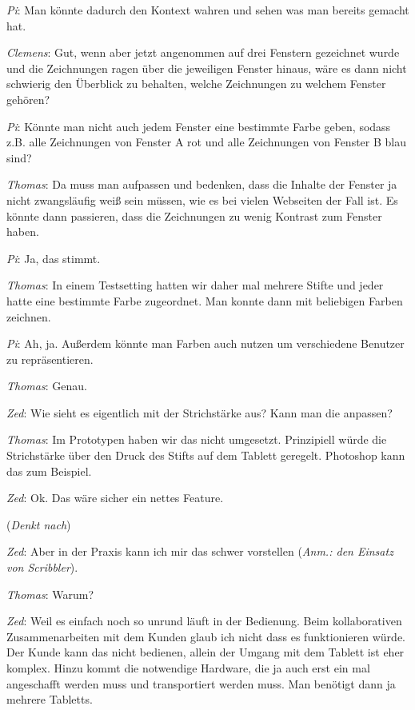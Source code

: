 \medskip \emph{Pi}: Man könnte dadurch den Kontext wahren und sehen was man bereits gemacht hat. 

\medskip \emph{Clemens}: Gut, wenn aber jetzt angenommen auf drei Fenstern gezeichnet wurde und die Zeichnungen ragen über die jeweiligen Fenster hinaus, wäre es dann nicht schwierig den Überblick zu behalten, welche Zeichnungen zu welchem Fenster gehören?

\medskip \emph{Pi}: Könnte man nicht auch jedem Fenster eine bestimmte Farbe geben, sodass z.B. alle Zeichnungen von Fenster A rot und alle Zeichnungen von Fenster B blau sind?

\medskip \emph{Thomas}: Da muss man aufpassen und bedenken, dass die Inhalte der Fenster ja nicht zwangsläufig weiß sein müssen, wie es bei vielen Webseiten der Fall ist. Es könnte dann passieren, dass die Zeichnungen zu wenig Kontrast zum Fenster haben.

\medskip \emph{Pi}: Ja, das stimmt.

\medskip \emph{Thomas}: In einem Testsetting hatten wir daher mal mehrere Stifte und jeder hatte eine bestimmte Farbe zugeordnet. Man konnte dann mit beliebigen Farben zeichnen.

\medskip \emph{Pi}: Ah, ja. Außerdem könnte man Farben auch nutzen um verschiedene Benutzer zu repräsentieren.

\medskip \emph{Thomas}: Genau.

\medskip \emph{Zed}: Wie sieht es eigentlich mit der Strichstärke aus? Kann man die anpassen?

\medskip \emph{Thomas}: Im Prototypen haben wir das nicht umgesetzt. Prinzipiell würde die Strichstärke über den Druck des Stifts auf dem Tablett geregelt. Photoshop kann das zum Beispiel.

\medskip \emph{Zed}: Ok. Das wäre sicher ein nettes Feature. 

\medskip (\emph{Denkt nach})

\medskip \emph{Zed}: Aber in der Praxis kann ich mir das schwer vorstellen (\emph{Anm.: den Einsatz von Scribbler}).

\medskip \emph{Thomas}: Warum?

\medskip \emph{Zed}: Weil es einfach noch so unrund läuft in der Bedienung. Beim kollaborativen Zusammenarbeiten mit dem Kunden glaub ich nicht dass es funktionieren würde. Der Kunde kann das nicht bedienen, allein der Umgang mit dem Tablett ist eher komplex. Hinzu kommt die notwendige Hardware, die ja auch erst ein mal angeschafft werden muss und transportiert werden muss. Man benötigt dann ja mehrere Tabletts. 


